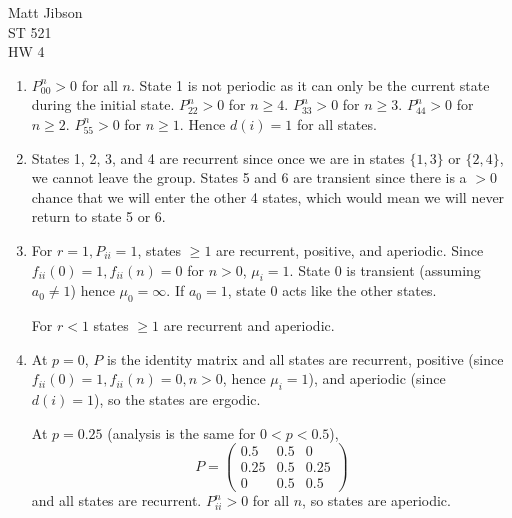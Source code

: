 \documentclass{article}
\begin{document}
\begin{flushright}
Matt Jibson \\
ST 521 \\
HW 4
\end{flushright}

\begin{enumerate}
	\item %
		$P_{00}^n > 0$ for all $n$. State 1 is not periodic as it can only be the current state during the initial state. $P_{22}^n > 0$ for $n \ge 4$. $P_{33}^n > 0$ for $n \ge 3$. $P_{44}^n > 0$ for $n \ge 2$. $P_{55}^n > 0$ for $n \ge 1$. Hence $d(i) = 1$ for all states.
	\item %
		States 1, 2, 3, and 4 are recurrent since once we are in states $\{1, 3\}$ or $\{2, 4\}$, we cannot leave the group. States 5 and 6 are transient since there is a $> 0$ chance that we will enter the other 4 states, which would mean we will never return to state 5 or 6.
	\item %
		For $r = 1, P_{ii} = 1$, states $\ge 1$ are recurrent, positive, and aperiodic. Since $f_{ii}(0) = 1, f_{ii}(n) = 0$ for $n > 0$, $\mu_i = 1$. State 0 is transient (assuming $a_0 \ne 1$) hence $\mu_0 = \infty$. If $a_0 = 1$, state 0 acts like the other states.

		For $r < 1$ states $\ge 1$ are recurrent and aperiodic.
	\item %
		At $p = 0$, $P$ is the identity matrix and all states are recurrent, positive (since $f_{ii}(0) = 1, f_{ii}(n) = 0, n > 0$, hence $\mu_i = 1$), and aperiodic (since $d(i) = 1$), so the states are ergodic.

		At $p = 0.25$ (analysis is the same for $0 < p < 0.5$),
		\begin{displaymath}
			P = \left( \begin{array}{ccc} 0.5 & 0.5 & 0 \\ 0.25 & 0.5 & 0.25 \\ 0 & 0.5 & 0.5 \end{array} \right)
		\end{displaymath}
		and all states are recurrent. $P_{ii}^n > 0$ for all $n$, so states are aperiodic.


\end{enumerate}
\end{document}
